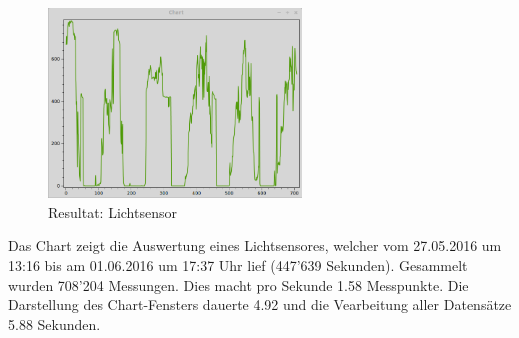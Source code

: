 \begin{figure}[H]
  \centering
  \includegraphics[width=0.6\textwidth]{./images/resultat.png}
  \caption{Resultat: Lichtsensor}
\end{figure}

Das Chart zeigt die Auswertung eines Lichtsensores, welcher vom 27.05.2016 um 13:16 bis am 01.06.2016 um 17:37 Uhr lief (447'639 Sekunden). Gesammelt wurden 708'204 Messungen. Dies macht pro Sekunde 1.58 Messpunkte. Die Darstellung des Chart-Fensters dauerte 4.92 und die Vearbeitung aller Datensätze 5.88 Sekunden.

